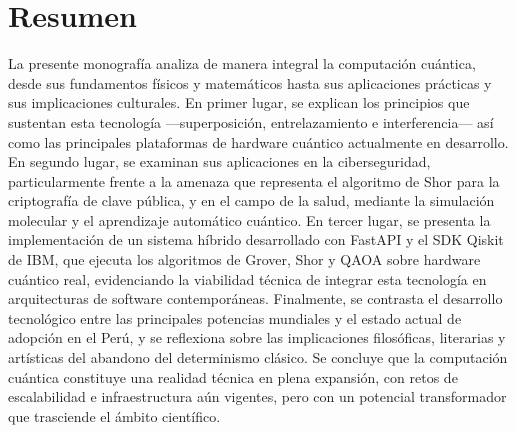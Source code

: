 \documentclass[12pt,a4paper]{article}
\begin{document}

\section*{Resumen}

La presente monografía analiza de manera integral la computación cuántica, desde sus fundamentos físicos y matemáticos hasta sus aplicaciones prácticas y sus implicaciones culturales. En primer lugar, se explican los principios que sustentan esta tecnología —superposición, entrelazamiento e interferencia— así como las principales plataformas de hardware cuántico actualmente en desarrollo. En segundo lugar, se examinan sus aplicaciones en la ciberseguridad, particularmente frente a la amenaza que representa el algoritmo de Shor para la criptografía de clave pública, y en el campo de la salud, mediante la simulación molecular y el aprendizaje automático cuántico. En tercer lugar, se presenta la implementación de un sistema híbrido desarrollado con FastAPI y el SDK Qiskit de IBM, que ejecuta los algoritmos de Grover, Shor y QAOA sobre hardware cuántico real, evidenciando la viabilidad técnica de integrar esta tecnología en arquitecturas de software contemporáneas. Finalmente, se contrasta el desarrollo tecnológico entre las principales potencias mundiales y el estado actual de adopción en el Perú, y se reflexiona sobre las implicaciones filosóficas, literarias y artísticas del abandono del determinismo clásico. Se concluye que la computación cuántica constituye una realidad técnica en plena expansión, con retos de escalabilidad e infraestructura aún vigentes, pero con un potencial transformador que trasciende el ámbito científico.

\vspace{0.5cm}

\newpage

\tableofcontents
\newpage

\setcounter{page}{1}

\end{document}
